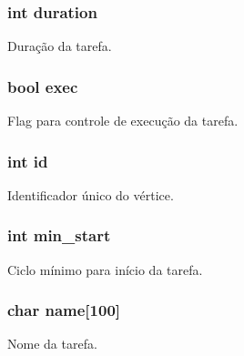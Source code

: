 \subsubsection[{\texorpdfstring{duration}{duration}}]{\setlength{\rightskip}{0pt plus 5cm}int duration}\hypertarget{structvertex_array_ac6e4b2a3cf932b33832d4e4e4e7cd0de}{}\label{structvertex_array_ac6e4b2a3cf932b33832d4e4e4e7cd0de}
Duração da tarefa. 
\subsubsection[{\texorpdfstring{exec}{exec}}]{\setlength{\rightskip}{0pt plus 5cm}bool exec}\hypertarget{structvertex_array_a3002b469e7a03a16ba4fd99322d10020}{}\label{structvertex_array_a3002b469e7a03a16ba4fd99322d10020}
Flag para controle de execução da tarefa. 
\subsubsection[{\texorpdfstring{id}{id}}]{\setlength{\rightskip}{0pt plus 5cm}int id}\hypertarget{structvertex_array_a7441ef0865bcb3db9b8064dd7375c1ea}{}\label{structvertex_array_a7441ef0865bcb3db9b8064dd7375c1ea}
Identificador único do vértice. 
\subsubsection[{\texorpdfstring{min\+\_\+start}{min_start}}]{\setlength{\rightskip}{0pt plus 5cm}int min\+\_\+start}\hypertarget{structvertex_array_af597b2d40f09352c45a7949e3efb475a}{}\label{structvertex_array_af597b2d40f09352c45a7949e3efb475a}
Ciclo mínimo para início da tarefa. 
\subsubsection[{\texorpdfstring{name}{name}}]{\setlength{\rightskip}{0pt plus 5cm}char name\mbox{[}100\mbox{]}}\hypertarget{structvertex_array_aeaf846aa21a7d016a52f0b5b0c2f5544}{}\label{structvertex_array_aeaf846aa21a7d016a52f0b5b0c2f5544}
Nome da tarefa. 
